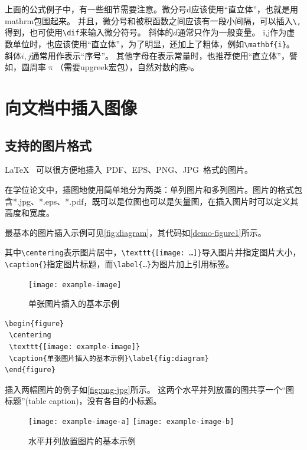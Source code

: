 上面的公式例子中，有一些细节需要注意。微分号d应该使用``直立体''，也就是用mathrm包围起来。
并且，微分号和被积函数之间应该有一段小间隔，可以插入\verb+\,+得到，也可使用\verb+\dif+来输入微分符号。
斜体的$d$通常只作为一般变量。
i,j作为虚数单位时，也应该使用``直立体''，为了明显，还加上了粗体，例如\verb+\mathbf{i}+。斜体$i,j$通常用作表示``序号''。
其他字母在表示常量时，也推荐使用``直立体''，譬如，圆周率$\uppi$（需要upgreek宏包），自然对数的底$\mathrm{e}$。


\section{向文档中插入图像}
\label{sec:insertimage}

\subsection{支持的图片格式}
\label{sec:imageformat}

\LaTeX~ 可以很方便地插入~PDF、EPS、PNG、JPG~格式的图片。

在学位论文中，插图地使用简单地分为两类：单列图片和多列图片。图片的格式包含*.jpg、*.eps、*.pdf，既可以是位图也可以是矢量图，在插入图片时可以定义其高度和宽度。

最基本的图片插入示例可见\autoref{fig:diagram}，其代码如\autoref{demo-figure1}所示。

其中\verb+\centering+表示图片居中，\verb+\texttt{[image: …]}+导入图片并指定图片大小，\verb+\caption{}+指定图片标题，而\verb+\label{…}+为图片加上引用标签。

\begin{figure}
 \centering
 \texttt{[image: example-image]}
 \caption{单张图片插入的基本示例}\label{fig:diagram}
\end{figure}

\begin{lstlisting}[language={[LaTeX]TeX}, caption={示例插图代码}, label=demo-figure1]
\begin{figure}
 \centering
 \texttt{[image: example-image]}
 \caption{单张图片插入的基本示例}\label{fig:diagram}
\end{figure}
\end{lstlisting}

插入两幅图片的例子如\autoref{fig:png-jpg}所示。
这两个水平并列放置的图共享一个``图标题''(table caption)，没有各自的小标题。

\begin{figure}
  \centering
  \texttt{[image: example-image-a]}
  \hspace{1cm}
  \texttt{[image: example-image-b]}
  \caption{水平并列放置图片的基本示例}
  \label{fig:png-jpg}
\end{figure}

